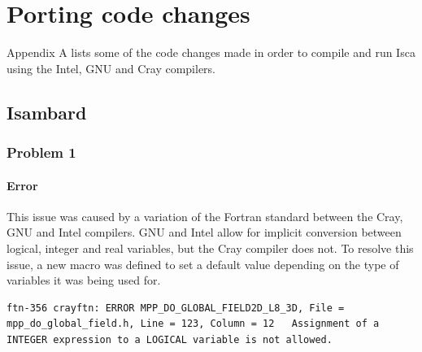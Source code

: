 \documentclass[a4paper,11pt]{report}
\begin{document}
	



%
\newpage
{}
\printbibliography
%

\appendix
\chapter{Porting code changes}
\label{apdx:porting}
Appendix A lists some of the code changes made in order to compile and run Isca using the Intel, GNU and Cray compilers. 
\section*{Isambard}
\subsection*{Problem 1}
\subsubsection*{Error}
This issue was caused by a variation of the Fortran standard between the Cray, GNU and Intel compilers. GNU and Intel allow for implicit conversion between logical, integer and real variables, but the Cray compiler does not. To resolve this issue, a new macro was defined to set a default value depending on the type of variables it was being used for. 
\begin{lstlisting}
ftn-356 crayftn: ERROR MPP_DO_GLOBAL_FIELD2D_L8_3D, File = mpp_do_global_field.h, Line = 123, Column = 12   Assignment of a INTEGER expression to a LOGICAL variable is not allowed.
\end{lstlisting}
\end{document}
